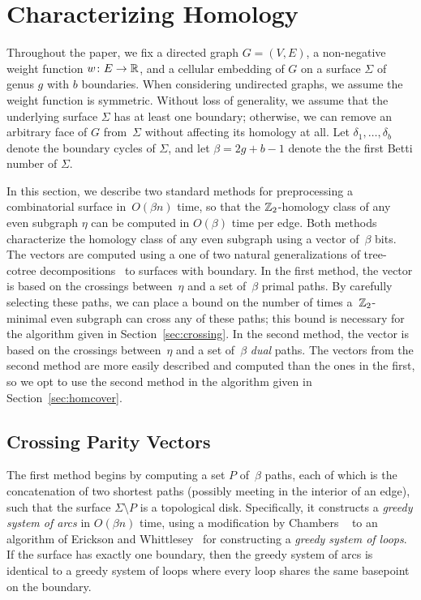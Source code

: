 \section{Characterizing Homology}
\label{sec:characterizing}

Throughout the paper, we fix a directed graph $G=(V,E)$, a non-negative weight function $w\colon E\to \mathbb{R}$, and a cellular embedding of $G$ on a surface $\Sigma$ of genus $g$ with $b$ boundaries.
When considering undirected graphs, we assume the weight function is symmetric.
Without loss of generality, we assume that the underlying surface $\Sigma$ has at least one boundary; otherwise, we can remove an arbitrary face of $G$ from~$\Sigma$ without affecting its homology at all.  Let $\delta_1, \dots, \delta_b$ denote the boundary cycles of $\Sigma$, and let $\beta = 2g+b-1$ denote the the first Betti number of $\Sigma$.

In this section, we describe two standard methods for preprocessing a combinatorial surface in~$O(\beta n)$ time, so that the $\mathbb{Z}_2$-homology class of any even subgraph $\eta$ can be computed in $O(\beta)$ time per edge.
Both methods characterize the homology class of any even subgraph using a vector of~$\beta$ bits.
The vectors are computed using a one of two natural generalizations of tree-cotree decompositions~\cite{e-dgteg-03} to surfaces with boundary.
In the first method, the vector is based on the crossings between~$\eta$ and a set of~$\beta$ primal paths.
By carefully selecting these paths, we can place a bound on the number of times a~$\mathbb{Z}_2$-minimal even subgraph can cross any of these paths; this bound is necessary for the algorithm given in Section~\ref{sec:crossing}.
In the second method, the vector is based on the crossings between~$\eta$ and a set of~$\beta$ \emph{dual} paths.
The vectors from the second method are more easily described and computed than the ones in the first, so we opt to use the second method in the algorithm given in Section~\ref{sec:homcover}.



\subsection{Crossing Parity Vectors}

The first method begins by computing a set $P$ of~$\beta$ paths, each of which is the concatenation of two shortest paths (possibly meeting in the interior of an edge), such that the surface $\Sigma\setminus P$ is a topological disk.
Specifically, it constructs a \emph{greedy system of arcs} in $O(\beta n)$ time, using a modification by Chambers \etal~\cite{ccelw-scsih-08} to an algorithm of Erickson and Whittlesey~\cite{ew-gohhg-05} for constructing a \emph{greedy system of loops}.
If the surface has exactly one boundary, then the greedy system of arcs is identical to a greedy system of loops where every loop shares the same basepoint on the boundary.

